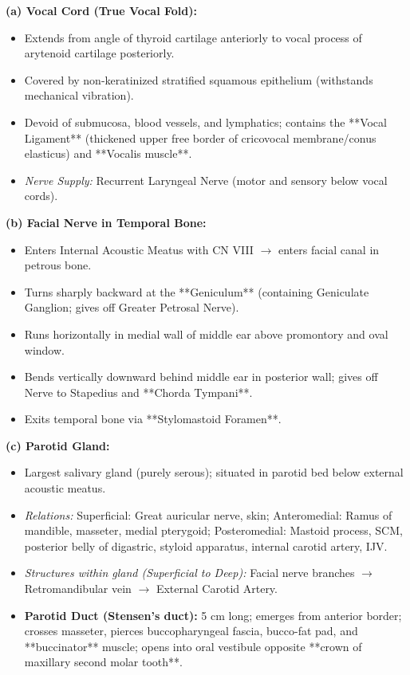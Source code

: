 \documentclass[11pt,a4paper]{article}
\begin{document}
\begin{ansbox}
\textbf{(a) Vocal Cord (True Vocal Fold):}
\begin{itemize}[leftmargin=*]
    \item Extends from angle of thyroid cartilage anteriorly to vocal process of arytenoid cartilage posteriorly.
    \item Covered by non-keratinized stratified squamous epithelium (withstands mechanical vibration).
    \item Devoid of submucosa, blood vessels, and lymphatics; contains the **Vocal Ligament** (thickened upper free border of cricovocal membrane/conus elasticus) and **Vocalis muscle**.
    \item \textit{Nerve Supply:} Recurrent Laryngeal Nerve (motor and sensory below vocal cords).
\end{itemize}

\textbf{(b) Facial Nerve in Temporal Bone:}
\begin{itemize}[leftmargin=*]
    \item Enters Internal Acoustic Meatus with CN VIII $\rightarrow$ enters facial canal in petrous bone.
    \item Turns sharply backward at the **Geniculum** (containing Geniculate Ganglion; gives off Greater Petrosal Nerve).
    \item Runs horizontally in medial wall of middle ear above promontory and oval window.
    \item Bends vertically downward behind middle ear in posterior wall; gives off Nerve to Stapedius and **Chorda Tympani**.
    \item Exits temporal bone via **Stylomastoid Foramen**.
\end{itemize}

\textbf{(c) Parotid Gland:}
\begin{itemize}[leftmargin=*]
    \item Largest salivary gland (purely serous); situated in parotid bed below external acoustic meatus.
    \item \textit{Relations:} Superficial: Great auricular nerve, skin; Anteromedial: Ramus of mandible, masseter, medial pterygoid; Posteromedial: Mastoid process, SCM, posterior belly of digastric, styloid apparatus, internal carotid artery, IJV.
    \item \textit{Structures within gland (Superficial to Deep):} Facial nerve branches $\rightarrow$ Retromandibular vein $\rightarrow$ External Carotid Artery.
    \item \textbf{Parotid Duct (Stensen's duct):} 5 cm long; emerges from anterior border; crosses masseter, pierces buccopharyngeal fascia, bucco-fat pad, and **buccinator** muscle; opens into oral vestibule opposite **crown of maxillary second molar tooth**.
\end{itemize}


\end{ansbox}
\end{document}
